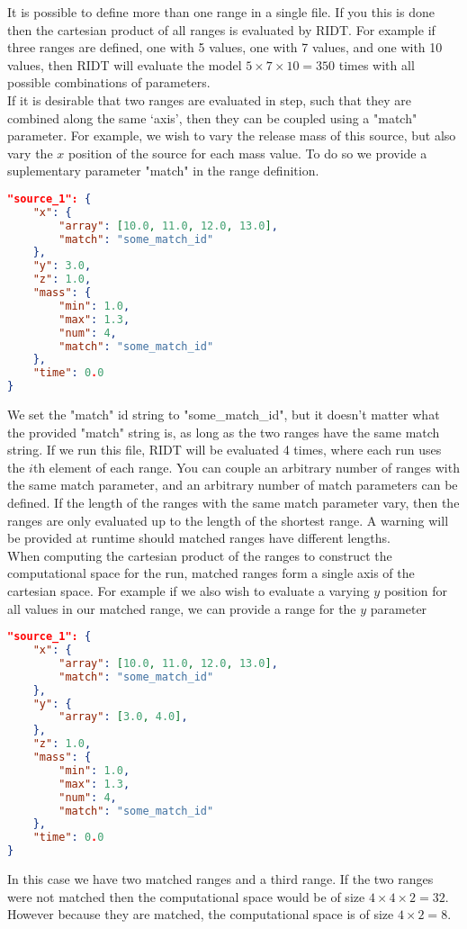 \documentclass[]{article}
\begin{document}
\noindent It is possible to define more than one range in a single file. If you
this is done then the cartesian product of all ranges is evaluated by RIDT. For
example if three ranges are defined, one with 5 values, one with 7 values, and
one with 10 values, then RIDT will evaluate the model $5\times7\times10=350$
times with all possible combinations of parameters.\\

\noindent If it is desirable that two ranges are evaluated in step, such that they are
combined along the same `axis', then they can be coupled using a "match"
parameter. For example, we wish to vary the release mass of this source, but
also vary the $x$ position of the source for each mass value. To do so we provide
a suplementary parameter "match" in the range definition.\\
\begin{lstlisting}[language=json,firstnumber=1]
"source_1": {
    "x": {
        "array": [10.0, 11.0, 12.0, 13.0],
        "match": "some_match_id"
    },
    "y": 3.0,
    "z": 1.0,
    "mass": {
        "min": 1.0,
        "max": 1.3,
        "num": 4,
        "match": "some_match_id"
    },
    "time": 0.0
}
\end{lstlisting}
\medskip
We set the "match" id string to "some\_match\_id", but it doesn't matter what the
provided "match" string is, as long as the two ranges have the same match
string. If we run this file, RIDT will be evaluated 4 times, where each run uses
the $i$th element of each range. You can couple an arbitrary number of ranges
with the same match parameter, and an arbitrary number of match parameters can
be defined. If the length of the ranges with the same match parameter vary, then
the ranges are only evaluated up to the length of the shortest range. A warning
will be provided at runtime should matched ranges have different lengths.\\

\noindent When computing the cartesian product of the ranges to construct the
computational space for the run, matched ranges form a single axis of the
cartesian space. For example if we also wish to evaluate a varying $y$ position
for all values in our matched range, we can provide a range for the $y$
parameter\\
\begin{lstlisting}[language=json,firstnumber=1]
"source_1": {
    "x": {
        "array": [10.0, 11.0, 12.0, 13.0],
        "match": "some_match_id"
    },
    "y": {
        "array": [3.0, 4.0],
    },
    "z": 1.0,
    "mass": {
        "min": 1.0,
        "max": 1.3,
        "num": 4,
        "match": "some_match_id"
    },
    "time": 0.0
}
\end{lstlisting}
\medskip
In this case we have two matched ranges and a third range. If the two ranges
were not matched then the computational space would be of size
$4\times4\times2=32$. However because they are matched, the computational space 
is of size $4\times2=8$.\\
\end{document}
